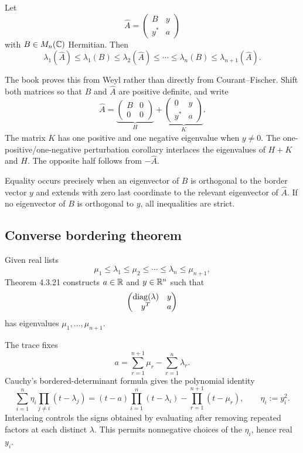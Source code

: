 
Let
\[
  \widehat A=
  \begin{pmatrix}
    B&y\\y^*&a
  \end{pmatrix}
\]
with $B\in M_n(\mathbb{C})$ Hermitian. Then
\begin{equation}
  \lambda_1(\widehat A)\le\lambda_1(B)\le\lambda_2(\widehat A)
  \le\cdots\le\lambda_n(B)\le\lambda_{n+1}(\widehat A). \tag{HJ-Cauchy}
\end{equation}

The book proves this from Weyl rather than directly from Courant--Fischer. Shift both matrices so that $B$ and $\widehat A$ are positive definite, and write
\[
  \widehat A=
  \underbrace{\begin{pmatrix}B&0\\0&0\end{pmatrix}}_{H}
  +
  \underbrace{\begin{pmatrix}0&y\\y^*&a\end{pmatrix}}_{K}.
\]
The matrix $K$ has one positive and one negative eigenvalue when $y\ne0$. The one-positive/one-negative perturbation corollary interlaces the eigenvalues of $H+K$ and $H$. The opposite half follows from $-\widehat A$.

Equality occurs precisely when an eigenvector of $B$ is orthogonal to the border vector $y$ and extends with zero last coordinate to the relevant eigenvector of $\widehat A$. If no eigenvector of $B$ is orthogonal to $y$, all inequalities are strict.

\subsection{Converse bordering theorem}

Given real lists
\[
  \mu_1\le\lambda_1\le\mu_2\le\cdots\le\lambda_n\le\mu_{n+1},
\]
Theorem 4.3.21 constructs $a\in\mathbb{R}$ and $y\in\mathbb{R}^n$ such that
\[
  \begin{pmatrix}\operatorname{diag}(\lambda)&y\\y^T&a\end{pmatrix}
\]
has eigenvalues $\mu_1,\dots,\mu_{n+1}$.

The trace fixes
\[
  a=\sum_{r=1}^{n+1}\mu_r-\sum_{r=1}^n\lambda_r.
\]
Cauchy's bordered-determinant formula gives the polynomial identity
\begin{equation}
  \sum_{i=1}^n\eta_i\prod_{j\ne i}(t-\lambda_j)
  =(t-a)\prod_{i=1}^n(t-\lambda_i)-\prod_{r=1}^{n+1}(t-\mu_r),
  \qquad \eta_i:=y_i^2. \tag{HJ-border-poly}
\end{equation}
Interlacing controls the signs obtained by evaluating after removing repeated factors at each distinct $\lambda$. This permits nonnegative choices of the $\eta_i$, hence real $y_i$.

